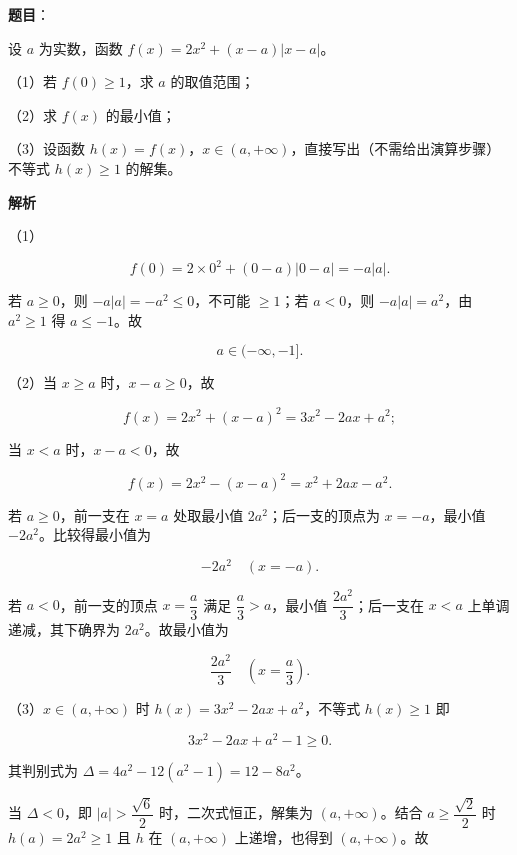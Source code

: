\begin{answer}

\textbf{题目}：

设 $a$ 为实数，函数 $f(x)=2x^2+(x-a)|x-a|$。

（1）若 $f(0)\geqslant1$，求 $a$ 的取值范围；

（2）求 $f(x)$ 的最小值；

（3）设函数 $h(x)=f(x)$，$x\in(a,+\infty)$，直接写出（不需给出演算步骤）不等式 $h(x)\geqslant1$ 的解集。

\textbf{解析}

（1）

\nopagebreak[4]
\[f(0)=2\times0^2+(0-a)|0-a|=-a|a| .\]

若 $a\geqslant0$，则 $-a|a|=-a^2\leqslant0$，不可能 $\geqslant1$；若 $a<0$，则 $-a|a|=a^2$，由 $a^2\geqslant1$ 得 $a\leqslant-1$。故

\nopagebreak[4]
\[a\in(-\infty,-1] .\]

（2）当 $x\geqslant a$ 时，$x-a\geqslant0$，故

\nopagebreak[4]
\[f(x)=2x^2+(x-a)^2=3x^2-2ax+a^2 ;\]

当 $x<a$ 时，$x-a<0$，故

\nopagebreak[4]
\[f(x)=2x^2-(x-a)^2=x^2+2ax-a^2 .\]

若 $a\geqslant0$，前一支在 $x=a$ 处取最小值 $2a^2$；后一支的顶点为 $x=-a$，最小值 $-2a^2$。比较得最小值为

\nopagebreak[4]
\[-2a^2\quad(x=-a).\]

若 $a<0$，前一支的顶点 $x=\dfrac a3$ 满足 $\dfrac a3>a$，最小值 $\dfrac{2a^2}3$；后一支在 $x<a$ 上单调递减，其下确界为 $2a^2$。故最小值为

\nopagebreak[4]
\[\frac{2a^2}3\quad\left(x=\frac a3\right).\]

（3）$x\in(a,+\infty)$ 时 $h(x)=3x^2-2ax+a^2$，不等式 $h(x)\geqslant1$ 即

\nopagebreak[4]
\[3x^2-2ax+a^2-1\geqslant0 .\]

其判别式为 $\Delta=4a^2-12(a^2-1)=12-8a^2$。

当 $\Delta<0$，即 $|a|>\dfrac{\sqrt6}2$ 时，二次式恒正，解集为 $(a,+\infty)$。结合 $a\geqslant\dfrac{\sqrt2}2$ 时 $h(a)=2a^2\geqslant1$ 且 $h$ 在 $(a,+\infty)$ 上递增，也得到 $(a,+\infty)$。故


\end{answer}
